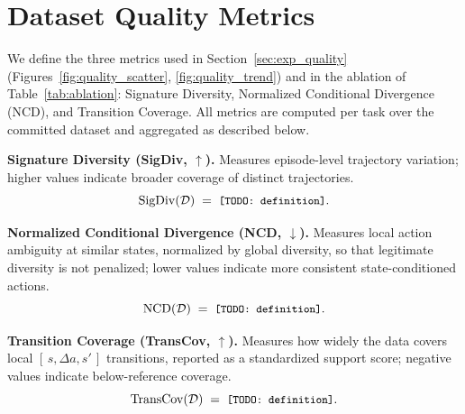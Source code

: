 \documentclass{article}
\begin{document}


\clearpage
\appendix
\renewcommand{\thetable}{A\arabic{table}}
\renewcommand{\thefigure}{A\arabic{figure}}
\setcounter{table}{0}
\setcounter{figure}{0}

\section{Dataset Quality Metrics}
\label{app:metrics}

We define the three metrics used in Section~\ref{sec:exp_quality} (Figures~\ref{fig:quality_scatter}, \ref{fig:quality_trend}) and in the ablation of Table~\ref{tab:ablation}: Signature Diversity, Normalized Conditional Divergence (NCD), and Transition Coverage. All metrics are computed per task over the committed dataset and aggregated as described below.

\textbf{Signature Diversity (SigDiv, $\uparrow$).}
Measures episode-level trajectory variation; higher values indicate broader coverage of distinct trajectories.
\begin{equation} \small
\mathrm{SigDiv}(\mathcal{D}) \;=\; \texttt{[TODO: definition]} .
\label{eq:metric-sigdiv}
\end{equation}

\textbf{Normalized Conditional Divergence (NCD, $\downarrow$).}
Measures local action ambiguity at similar states, normalized by global diversity, so that legitimate diversity is not penalized; lower values indicate more consistent state-conditioned actions.
\begin{equation} \small
\mathrm{NCD}(\mathcal{D}) \;=\; \texttt{[TODO: definition]} .
\label{eq:metric-ncd}
\end{equation}

\textbf{Transition Coverage (TransCov, $\uparrow$).}
Measures how widely the data covers local $[\,s,\Delta a,s'\,]$ transitions, reported as a standardized support score; negative values indicate below-reference coverage.
\begin{equation} \small
\mathrm{TransCov}(\mathcal{D}) \;=\; \texttt{[TODO: definition]} .
\label{eq:metric-transcov}
\end{equation}
\end{document}
